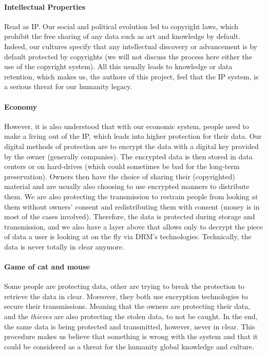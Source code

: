 \paragraph{Intellectual Properties} Read as IP. Our social and political evolution led to copyright laws, which prohibit the free sharing of any data such as art and knowledge by default. Indeed, our cultures specify that any intellectual discovery or advancement is by default protected by copyrights (we will not discuss the process here either the use of the copyright system). All this usually leads to knowledge or data retention, which makes us, the authors of this project, feel that the IP system, is a serious threat for our humanity legacy.

\paragraph{Economy} However, it is also understood that with our economic system, people need to make a living out of the IP, which leads into higher protection for their data. Our digital methods of protection are to encrypt the data with a digital key provided by the owner (generally companies). The encrypted data is then stored in data centers or on hard-drives (which could sometimes be bad for the long-term preservation). Owners then have the choice of sharing their (copyrighted) material and are usually also choosing to use encrypted manners to distribute them. We are also protecting the transmission to restrain people from looking at them without owners' consent and redistributing them with consent (money is in most of the cases involved). Therefore, the data is protected during storage and transmission, and we also have a layer above that allows only to decrypt the piece of data a user is looking at on the fly via DRM's technologies. Technically, the data is never totally in clear anymore.

\paragraph{Game of cat and mouse} Some people are protecting data, other are trying to break the protection to retrieve the data in clear. Moreover, they both use encryption technologies to secure their transmissions. Meaning that the owners are protecting their data, and the \textit{thieves} are also protecting the stolen data, to not be caught. In the end, the same data is being protected and transmitted, however, never in clear. This procedure makes us believe that something is wrong with the system and that it could be considered as a threat for the humanity global knowledge and culture.

